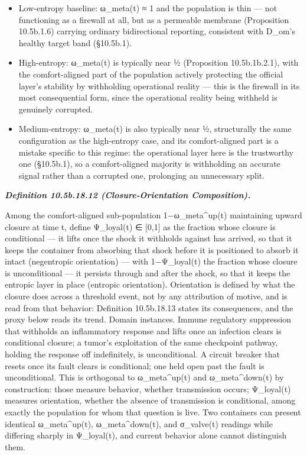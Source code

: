 \documentclass[
]{article}
\begin{document}
\begin{itemize}
\item
  Low-entropy baseline: ω\_meta(t) ≈ 1 and the population is thin ---
  not functioning as a firewall at all, but as a permeable membrane
  (Proposition 10.5b.1.6) carrying ordinary bidirectional reporting,
  consistent with D\_om's healthy target band (§10.5b.1).
\item
  High-entropy: ω\_meta(t) is typically near ½ (Proposition
  10.5b.1b.2.1), with the comfort-aligned part of the population
  actively protecting the official layer's stability by withholding
  operational reality --- this is the firewall in its most consequential
  form, since the operational reality being withheld is genuinely
  corrupted.
\item
  Medium-entropy: ω\_meta(t) is also typically near ½, structurally the
  same configuration as the high-entropy case, and its comfort-aligned
  part is a mistake specific to this regime: the operational layer here
  is the trustworthy one (§10.5b.1), so a comfort-aligned majority is
  withholding an accurate signal rather than a corrupted one, prolonging
  an unnecessary split.
\end{itemize}

\emph{\textbf{Definition 10.5b.18.12 (Closure-Orientation
Composition).}}

Among the comfort-aligned sub-population 1−ω\_meta\^{}up(t) maintaining
upward closure at time t, define Ψ\_loyal(t) ∈ {[}0,1{]} as the fraction
whose closure is conditional --- it lifts once the shock it withholds
against has arrived, so that it keeps the container from absorbing that
shock before it is positioned to absorb it intact (negentropic
orientation) --- with 1−Ψ\_loyal(t) the fraction whose closure is
unconditional --- it persists through and after the shock, so that it
keeps the entropic layer in place (entropic orientation). Orientation is
defined by what the closure does across a threshold event, not by any
attribution of motive, and is read from that behavior: Definition
10.5b.18.13 states its consequences, and the proxy below reads its
trend. Domain instances. Immune regulatory suppression that withholds an
inflammatory response and lifts once an infection clears is conditional
closure; a tumor's exploitation of the same checkpoint pathway, holding
the response off indefinitely, is unconditional. A circuit breaker that
resets once its fault clears is conditional; one held open past the
fault is unconditional. This is orthogonal to ω\_meta\^{}up(t) and
ω\_meta\^{}down(t) by construction: those measure behavior, whether
transmission occurs; Ψ\_loyal(t) measures orientation, whether the
absence of transmission is conditional, among exactly the population for
whom that question is live. Two containers can present identical
ω\_meta\^{}up(t), ω\_meta\^{}down(t), and σ\_valve(t) readings while
differing sharply in Ψ\_loyal(t), and current behavior alone cannot
distinguish them.
\end{document}
